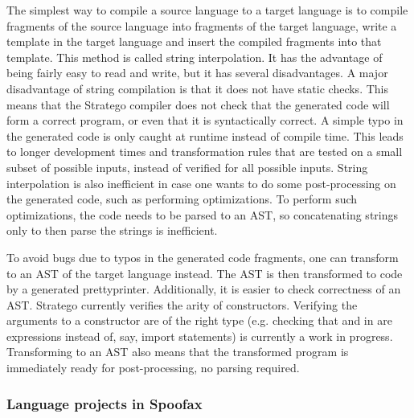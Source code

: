 The simplest way to compile a source language to a target language is to compile fragments of the source language into fragments of the target language, write a template in the target language and insert the compiled fragments into that template.
This method is called string interpolation.
It has the advantage of being fairly easy to read and write, but it has several disadvantages.
A major disadvantage of string compilation is that it does not have static checks.
This means that the Stratego compiler  does not check that the generated code will form a correct program, or even that it is syntactically correct.
A simple typo in the generated code is only caught at runtime instead of compile time.
This leads to longer development times and transformation rules that are tested on a small subset of possible inputs, instead of verified for all possible inputs.
String interpolation is also inefficient in case one wants to do some post-processing on the generated code, such as performing optimizations.
To perform such optimizations, the code needs to be parsed to an AST, so concatenating strings only to then parse the strings is inefficient.

To avoid bugs due to typos in the generated code fragments, one can transform to an \ac{AST} of the target language instead.
The \ac{AST} is then transformed to code by a generated prettyprinter.
Additionally, it is easier to check correctness of an \ac{AST}.
Stratego currently verifies the arity of constructors.
Verifying the arguments to a constructor are of the right type (e.g. checking that  and  in  are expressions instead of, say, import statements) is currently a work in progress.
Transforming to an \ac{AST} also means that the transformed program is immediately ready for post-processing, no parsing required.

\subsubsection{Language projects in Spoofax}
\label{subsubsec:problem_analysis__background__spoofax_language_projects}


